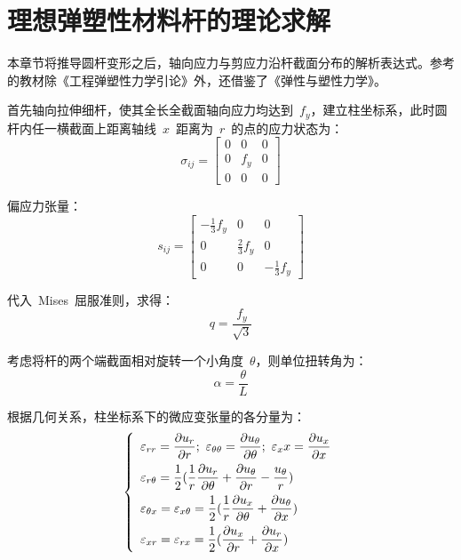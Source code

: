 \chapter{理想弹塑性材料杆的理论求解}
\label{cha:ideal_theory}
本章节将推导圆杆变形之后，轴向应力与剪应力沿杆截面分布的解析表达式。参考的教材除《工程弹塑性力学引论》外，还借鉴了《弹性与塑性力学》\cite{txysxlx}。

首先轴向拉伸细杆，使其全长全截面轴向应力均达到~{$f_y$}，建立柱坐标系，此时圆杆内任一横截面上距离轴线~{$x$}~距离为~{$r$}~的点的应力状态为：
\begin{equation}\label{eq4}
    \sigma_{ij} = \begin{bmatrix}
        0 & 0 & 0 \\
        0 & f_y & 0 \\
        0 & 0 & 0
        \end{bmatrix}
\end{equation} 

偏应力张量：
\begin{equation}\label{eq5}
    s_{ij} = \begin{bmatrix}
        -\frac{1}{3}f_y & 0 & 0 \\
        0 & \frac{2}{3}f_y & 0 \\
        0 & 0 & -\frac{1}{3}f_y
        \end{bmatrix}
\end{equation} 

代入~Mises~屈服准则，求得：
\begin{equation}\label{eq6}
    q = \frac{f_y}{\sqrt{3}}
\end{equation} 

考虑将杆的两个端截面相对旋转一个小角度~{$\theta$}，则单位扭转角为：
\begin{equation}\label{eq7}
    \alpha  = \frac{\theta }{L}
\end{equation} 

根据几何关系，柱坐标系下的微应变张量的各分量为：
\begin{equation}\label{eq8}
    \left\{
        \begin{array}{l}
            \varepsilon_{rr} = \dfrac{\partial u_r}{\partial r};~ \varepsilon_{\theta\theta} = \dfrac{\partial u_\theta}{\partial \theta};~ \varepsilon_xx = \dfrac{\partial u_x}{\partial x}\vspace{1ex}\\
            \varepsilon_{r\theta} = \dfrac{1}{2}(\dfrac{1}{r}\dfrac{\partial u_r}{\partial \theta}+\dfrac{\partial u_\theta}{\partial r}-\dfrac{u_\theta}{r})\vspace{1ex}\\
            \varepsilon_{\theta x} = \varepsilon_{x \theta}=\dfrac{1}{2}(\dfrac{1}{r}\dfrac{\partial u_x}{\partial \theta}+\dfrac{\partial u_\theta}{\partial x})\vspace{1ex}\\
            \varepsilon_{xr} = \varepsilon_{rx}=\dfrac{1}{2}(\dfrac{\partial u_x}{\partial r}+\dfrac{\partial u_r}{\partial x})\\
        \end{array}
    \right.
\end{equation} 

